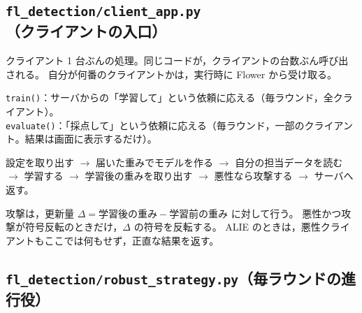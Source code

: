 \documentclass[a4j, dvipdfmx]{jsarticle}  %
\begin{document}
\subsection{\texttt{fl\_detection/client\_app.py}（クライアントの入口）}

\begin{description}[leftmargin=1.4em, style=nextline]
  \item[役割] クライアント 1 台ぶんの処理。同じコードが，クライアントの台数ぶん呼び出される。
        自分が何番のクライアントかは，実行時に Flower から受け取る。
  \item[主な関数]
        \texttt{train()}：サーバからの「学習して」という依頼に応える（毎ラウンド，全クライアント）。\\
        \texttt{evaluate()}：「採点して」という依頼に応える（毎ラウンド，一部のクライアント。結果は画面に表示するだけ）。
  \item[\texttt{train()} の流れ]
        設定を取り出す $\rightarrow$ 届いた重みでモデルを作る $\rightarrow$ 自分の担当データを読む $\rightarrow$
        学習する $\rightarrow$ 学習後の重みを取り出す $\rightarrow$ 悪性なら攻撃する $\rightarrow$ サーバへ返す。
  \item[要点] 攻撃は，更新量 $\Delta = \text{学習後の重み} - \text{学習前の重み}$ に対して行う。
        悪性かつ攻撃が符号反転のときだけ，$\Delta$ の符号を反転する。
        ALIE のときは，悪性クライアントもここでは何もせず，正直な結果を返す。
\end{description}

\subsection{\texttt{fl\_detection/robust\_strategy.py}（毎ラウンドの進行役）}
\end{document}

